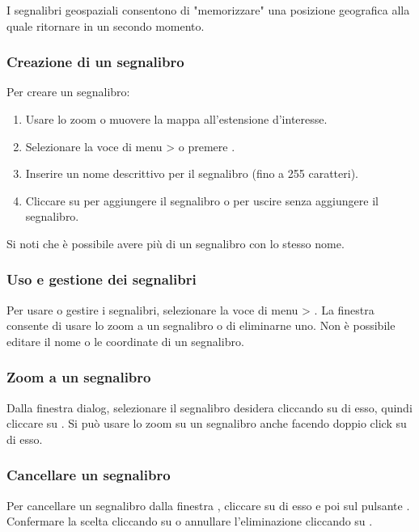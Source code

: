I segnalibri geospaziali consentono di "memorizzare" una posizione
geografica alla quale ritornare in un secondo momento.

\subsubsection{Creazione di un segnalibro}
Per creare un segnalibro:
\begin{enumerate}
\item Usare lo zoom o muovere la mappa all'estensione d'interesse.
\item Selezionare la voce di menu  >
 o premere .
\item Inserire un nome descrittivo per il segnalibro (fino a 255 caratteri).
\item Cliccare su  per aggiungere il segnalibro o 
per uscire senza aggiungere il segnalibro.
\end{enumerate}

Si noti che è possibile avere più di un segnalibro con lo stesso nome.

\subsubsection{Uso e gestione dei segnalibri}
Per usare o gestire i segnalibri, selezionare la voce di menu
 > .
La finestra  consente di usare lo zoom a un
segnalibro o di eliminarne uno.
Non è possibile editare il nome o le coordinate di un segnalibro.
\subsubsection{Zoom a un segnalibro}
Dalla finestra  dialog, selezionare il
segnalibro desidera cliccando su di esso, quindi cliccare su .
Si può usare lo zoom su un segnalibro anche facendo doppio click su di esso.

\subsubsection{Cancellare un segnalibro}
Per cancellare un segnalibro dalla finestra ,
cliccare su di esso e poi sul pulsante .
Confermare la scelta cliccando su  o annullare l'eliminazione
cliccando su .
